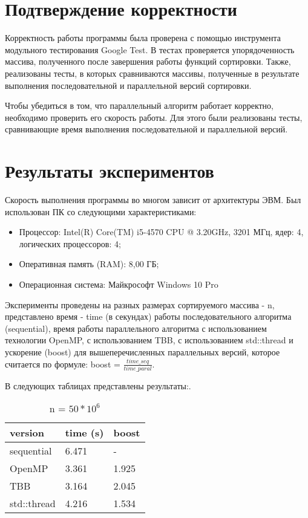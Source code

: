 \documentclass{report}
\begin{document}
\section*{Подтверждение корректности}
\par Корректность работы программы была проверена с помощью инструмента модульного тестирования Google Test. В тестах проверяется упорядоченность массива, полученного после завершения работы функций сортировки. Также, реализованы тесты, в которых сравниваются массивы, полученные в результате выполнения последовательной и параллельной версий сортировки.
\par Чтобы убедиться в том, что параллельный алгоритм работает корректно, необходимо проверить его скорость работы. Для этого были реализованы тесты, сравнивающие время выполнения последовательной и параллельной версий.
\newpage

\section*{Результаты экспериментов}
Скорость выполнения программы во многом зависит от архитектуры ЭВМ. Был использован ПК со следующими характеристиками:
\begin{itemize}
\item Процессор: Intel(R) Core(TM) i5-4570 CPU @ 3.20GHz, 3201 МГц, ядер: 4, логических процессоров: 4;
\item Оперативная память (RAM): 8,00 ГБ;
\item Операционная система: Майкрософт Windows 10 Pro
\end{itemize}
\par Эксперименты проведены на разных размерах сортируемого массива - n, представлено время - time (в секундах) работы последовательного алгоритма (sequential), время работы параллельного алгоритма с использованием технологии OpenMP, с использованием TBB, с использованием std::thread и ускорение (boost) для вышеперечисленных параллельных версий, которое считается по формуле: boost = $\frac{time\_seq}{time\_paral}$.

\par В следующих таблицах представлены результаты:.

\begin{table}[!h]
\centering
\begin{tabular}{| p{3cm} | p{3cm} | p{2cm} |}
\hline
version & time (s) & boost  \\[5pt]
\hline
sequential        & 6.471      & -  \\
OpenMP         & 3.361     & 1.925   \\
TBB        & 3.164      & 2.045   \\
std::thread        & 4.216     & 1.534   \\
\hline
\end{tabular}
\caption{n = $50 * 10^6$}
\end{table}
\end{document}
